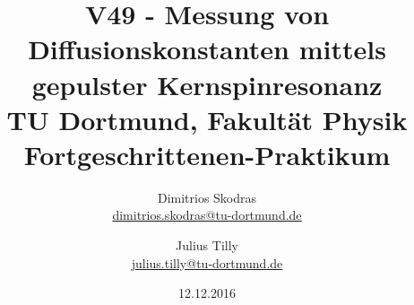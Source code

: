 

\usepackage{xfrac}
\usepackage{xcolor}
\usepackage{setspace}\usepackage{threeparttable}
\usepackage{fancyhdr}
\usepackage{graphicx}
\usepackage[official]{eurosym}
\usepackage{geometry}
\newcommand{\ti}{\text{i}}
\usepackage{siunitx}


\title{V49 - Messung von Diffusionskonstanten mittels gepulster Kernspinresonanz\\
\hspace{15cm}%
	\large TU Dortmund, Fakultät Physik\\ 
	\normalsize Fortgeschrittenen-Praktikum}

\author{Dimitrios Skodras\\			%
	{\small \href{dimitrios.skodras@tu-dortmund.de}{dimitrios.skodras@tu-dortmund.de}}	%
	\and						%
	Julius Tilly\\					%
	{\small \href{julius.tilly@tu-dortmund.de}{julius.tilly@tu-dortmund.de}}		%
}
\date{12.12.2016}				%



	

\maketitle					%
\thispagestyle{empty} 				%



\tableofcontents


